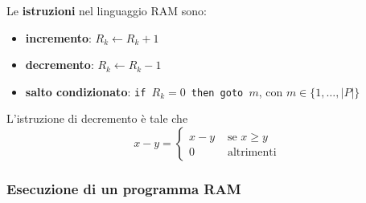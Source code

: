Le \textbf{istruzioni} nel linguaggio RAM sono: 
\begin{itemize}
	\item \textbf{incremento}: $R_k \leftarrow R_k + 1$
	\item \textbf{decremento}: $R_k \leftarrow R_k - 1$
	\item \textbf{salto condizionato}: \texttt{if $R_k = 0$ then goto $m$}, con $m \in \{1, \dots, |P|\}$
\end{itemize}
L'istruzione di decremento è tale che
$$ x - y = \begin{cases}
	x-y & \text{ se } x \geq y\\
	0 & \text{ altrimenti }
\end{cases}$$

\begin{center}
	
\end{center}

\subsubsection{Esecuzione di un programma RAM}





